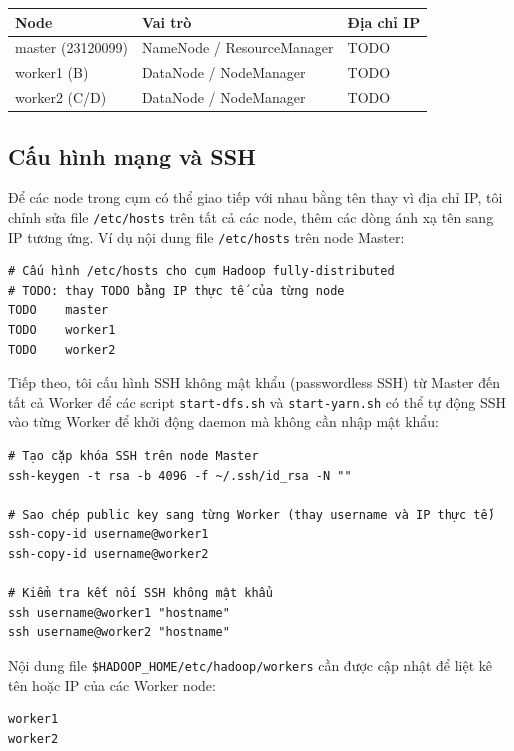 \documentclass[12pt]{article}
\begin{document}
\begin{center}
\begin{tabular}{lll}
\toprule
\textbf{Node} & \textbf{Vai trò} & \textbf{Địa chỉ IP} \\
\midrule
master (23120099) & NameNode / ResourceManager & TODO \\
worker1 (B)       & DataNode / NodeManager     & TODO \\
worker2 (C/D)     & DataNode / NodeManager     & TODO \\
\bottomrule
\end{tabular}
\end{center}

\subsection{Cấu hình mạng và SSH}

Để các node trong cụm có thể giao tiếp với nhau bằng tên thay vì địa chỉ IP, tôi
chỉnh sửa file \texttt{/etc/hosts} trên tất cả các node, thêm các dòng ánh xạ tên
sang IP tương ứng. Ví dụ nội dung file \texttt{/etc/hosts} trên node Master:

\begin{verbatim}
# Cấu hình /etc/hosts cho cụm Hadoop fully-distributed
# TODO: thay TODO bằng IP thực tế của từng node
TODO    master
TODO    worker1
TODO    worker2
\end{verbatim}

Tiếp theo, tôi cấu hình SSH không mật khẩu (passwordless SSH) từ Master đến tất cả
Worker để các script \texttt{start-dfs.sh} và \texttt{start-yarn.sh} có thể tự động
SSH vào từng Worker để khởi động daemon mà không cần nhập mật khẩu:

\begin{verbatim}
# Tạo cặp khóa SSH trên node Master
ssh-keygen -t rsa -b 4096 -f ~/.ssh/id_rsa -N ""

# Sao chép public key sang từng Worker (thay username và IP thực tế)
ssh-copy-id username@worker1
ssh-copy-id username@worker2

# Kiểm tra kết nối SSH không mật khẩu
ssh username@worker1 "hostname"
ssh username@worker2 "hostname"
\end{verbatim}

Nội dung file \texttt{\$HADOOP\_HOME/etc/hadoop/workers} cần được cập nhật để liệt
kê tên hoặc IP của các Worker node:

\begin{verbatim}
worker1
worker2
\end{verbatim}
\end{document}
